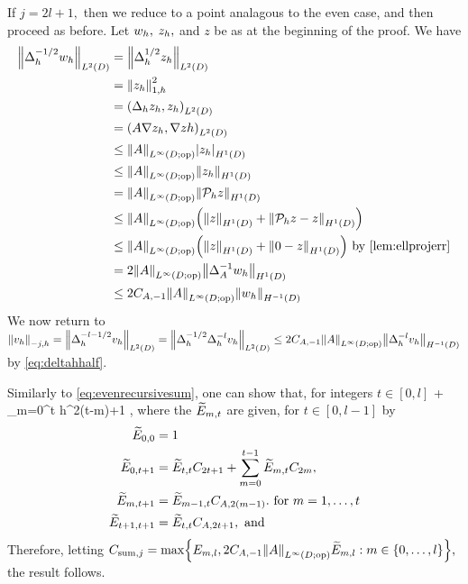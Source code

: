 If $j=2l+1,$ then we reduce to a point analagous to the even case, and then proceed as before. Let $w_{h},$ $z_{h},$ and $z$ be as at the beginning of the proof. We have
\begin{align}
\NLtD{\Deltah^{-1/2}\wh} &= \NLtD{\Deltah^{1/2} \zh}\nonumber\\
&= \Noh{\zh}^2\nonumber\\
&= \IPLtD{\Deltah \zh}{\zh}\\
&= \IPLtD{A \grad \zh}{\grad zh}\nonumber\\
&\leq \NLiDop{A} \SNHoD{\zh}\nonumber\\
&\leq \NLiDop{A} \NHoD{\zh}\nonumber\\
&= \NLiDop{A} \NHoD{\Ph z}\nonumber\\
&\leq \NLiDop{A}\mleft(\NHoD{z} + \NHoD{\Ph z - z}\mright)\nonumber\\
&\leq \NLiDop{A}\mleft(\NHoD{z} + \NHoD{0 - z}\mright) \text{ by \cref{lem:ellprojerr}}\nonumber\\
&= 2\NLiDop{A}\NHoD{\DeltaAI \wh}\nonumber\\
&\leq 2\CAmo \NLiDop{A} \NHmoD{\wh}\label{eq:deltahhalf}
\end{align}
We now return to $\Nmjh{\vh} = \NLtD{\Deltah^{-l-1/2} \vh} = \NLtD{\Deltah^{-1/2} \Deltah^{-l} \vh} \leq 2\CAmo \NLiDop{A} \NHmoD{\Deltah^{-l} \vh}$ by \cref{eq:deltahhalf}.

Similarly to \cref{eq:evenrecursivesum}, one can show that, for integers $t \in [0,l]$
\beqs
{} \leq {}  + \sum_{m=0}^t h^{2(t-m)+1}  ,
\eeqs
where  the $\widetilde{E}_{m,t}$ are given, for $t \in [0,l-1]$ by
\begin{align}
\label{eq:Etilde1}\widetilde{E}_{0,0} &= 1\\
\label{eq:Etilde2}\widetilde{E}_{0,t+1} &= \widetilde{E}_{t,t}C_{2t+1} + \sum_{m=0}^{t-1} \widetilde{E}_{m,t}C_{2m},\\
\label{eq:Etilde3}\widetilde{E}_{m,t+1} &= \widetilde{E}_{m-1,t}C_{A,2(m-1)}.\text{ for } m = 1,\ldots,t\\
\label{eq:Etilde4}\widetilde{E}_{t+1,t+1} &= \widetilde{E}_{t,t}C_{A,2t+1},\text{ and }
\end{align}
Therefore, letting $\Csumj = \max\set{\Efn{m,l},2\CAmo\NLiDop{A}\Etildefn{m,l} \st m \in \set{0,\ldots,l}},$ the result follows.
\epf

